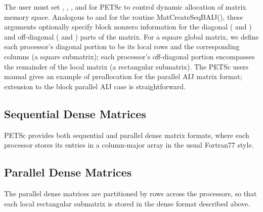\documentclass[twoside,12pt]{../sty/report_petsc}
\begin{document}
The user must set , , , and 
 for PETSc to control dynamic allocation of matrix
memory space.  Analogous to  and  for the routine 
MatCreateSeqBAIJ(), these arguments optionally specify 
block nonzero information for the diagonal ( and ) and 
off-diagonal ( and ) parts of the matrix. 
For a square global matrix, we define each processor's diagonal portion 
to be its local rows and the corresponding columns (a square submatrix);  
each processor's off-diagonal portion encompasses the remainder of the
local matrix (a rectangular submatrix).  
The PETSc users manual gives an example of preallocation for
the parallel AIJ matrix format; extension to the block parallel AIJ case
is straightforward.

\subsection{Sequential Dense Matrices}

PETSc provides both sequential and parallel dense matrix formats,
where each processor stores its entries in a column-major array in the
usual Fortran77 style. 

\subsection{Parallel Dense Matrices}

The parallel dense matrices are partitioned by rows across the
processors, so that each local rectangular submatrix is stored in the
dense format described above.



\end{document}
